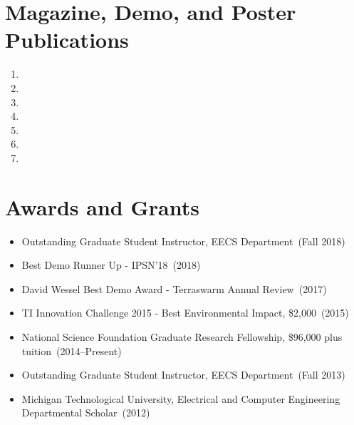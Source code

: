 \documentclass{article}
\begin{document}
\section*{Magazine, Demo, and Poster Publications}
\begin{enumerate}
  \item {}
  \item {}
  \item {}
  \item {}
  \item {}
  \item {}
  \item {}
\end{enumerate}




\section*{Awards and Grants}
\vspace{-6pt}
\begin{itemize}
  \item[] Outstanding Graduate Student Instructor, EECS Department~(Fall 2018)
  \item[] Best Demo Runner Up - IPSN'18~(2018)
  \item[] David Wessel Best Demo Award - Terraswarm Annual Review~(2017)
  \item[] TI Innovation Challenge 2015 - Best Environmental Impact, \$2,000~(2015)
  \item[] National Science Foundation Graduate Research Fellowship, \$96,000 plus tuition~(2014--Present)
  \item[] Outstanding Graduate Student Instructor, EECS Department~(Fall 2013)
  \item[] Michigan Technological University, Electrical and Computer Engineering Departmental Scholar~(2012)
\end{itemize}
\end{document}
